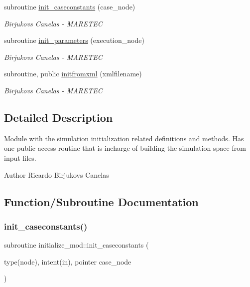 \begin{DoxyCompactItemize}
subroutine \hyperlink{namespaceinitialize__mod_a9d19665b9ac12c3db8b0842bfdb6fa0c}{init\+\_\+caseconstants} (case\+\_\+node)
\begin{DoxyCompactList}\small\item\em Birjukovs Canelas -\/ M\+A\+R\+E\+T\+EC \end{DoxyCompactList}\item 
subroutine \hyperlink{namespaceinitialize__mod_aac9d9dabb797c83e360f9ae60a7e65e3}{init\+\_\+parameters} (execution\+\_\+node)
\begin{DoxyCompactList}\small\item\em Birjukovs Canelas -\/ M\+A\+R\+E\+T\+EC \end{DoxyCompactList}\item 
subroutine, public \hyperlink{namespaceinitialize__mod_a107012ffec69fe2d7c524d240193439e}{initfromxml} (xmlfilename)
\begin{DoxyCompactList}\small\item\em Birjukovs Canelas -\/ M\+A\+R\+E\+T\+EC \end{DoxyCompactList}\end{DoxyCompactItemize}


\subsection{Detailed Description}
Module with the simulation initialization related definitions and methods. Has one public access routine that is incharge of building the simulation space from input files. 

\begin{DoxyAuthor}{Author}
Ricardo Birjukovs Canelas 
\end{DoxyAuthor}


\subsection{Function/\+Subroutine Documentation}
\mbox{\label{namespaceinitialize__mod_a9d19665b9ac12c3db8b0842bfdb6fa0c}} 
\subsubsection{\texorpdfstring{init\+\_\+caseconstants()}{init\_caseconstants()}}
{\footnotesize\ttfamily subroutine initialize\+\_\+mod\+::init\+\_\+caseconstants (\begin{DoxyParamCaption}\item[{type(node), intent(in), pointer}]{case\+\_\+node }\end{DoxyParamCaption})\hspace{0.3cm}{\ttfamily [private]}}



